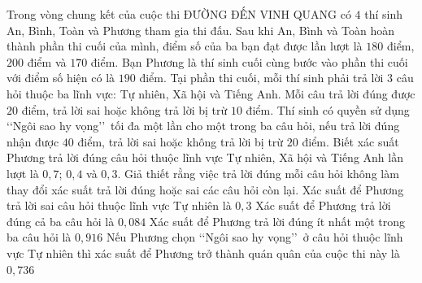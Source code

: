 \begin{ex}%
	Trong vòng chung kết của cuộc thi ĐƯỜNG ĐẾN VINH QUANG có $4$ thí sinh An, Bình, Toàn và Phương tham gia thi đấu. Sau khi An, Bình và Toàn hoàn thành phần thi cuối của mình, điểm số của ba bạn đạt được lần lượt là $180$ điểm, $200$ điểm và $170$ điểm. Bạn Phương là thí sinh cuối cùng bước vào phần thi cuối với điểm số hiện có là $190$ điểm. Tại phần thi cuối, mỗi thí sinh phải trả lời $3$ câu hỏi thuộc ba lĩnh vực: Tự nhiên, Xã hội và Tiếng Anh. Mỗi câu trả lời đúng được $20$ điểm, trả lời sai hoặc không trả lời bị trừ $10$ điểm. Thí sinh có quyền sử dụng \lq\lq Ngôi sao hy vọng\rq\rq\ tối đa một lần cho một trong ba câu hỏi, nếu trả lời đúng nhận được $40$ điểm, trả lời sai hoặc không trả lời bị trừ $20$ điểm. Biết xác suất Phương trả lời đúng câu hỏi thuộc lĩnh vực Tự nhiên, Xã hội và Tiếng Anh lần lượt là $0{,}7$; $0{,}4$ và $0{,}3$. Giả thiết rằng việc trả lời đúng mỗi câu hỏi không làm thay đổi xác suất trả lời đúng hoặc sai các câu hỏi còn lại.
	\choiceTF
	{\True Xác suất để Phương trả lời sai câu hỏi thuộc lĩnh vực Tự nhiên là $0{,}3$}
	{\True Xác suất để Phương trả lời đúng cả ba câu hỏi là $0{,}084$}
	{Xác suất để Phương trả lời đúng ít nhất một trong ba câu hỏi là $0{,}916$}
	{\True Nếu Phương chọn \lq\lq Ngôi sao hy vọng\rq\rq\ ở câu hỏi thuộc lĩnh vực Tự nhiên thì xác suất để Phương trở thành quán quân của cuộc thi này là $0{,}736$}
\end{ex}

